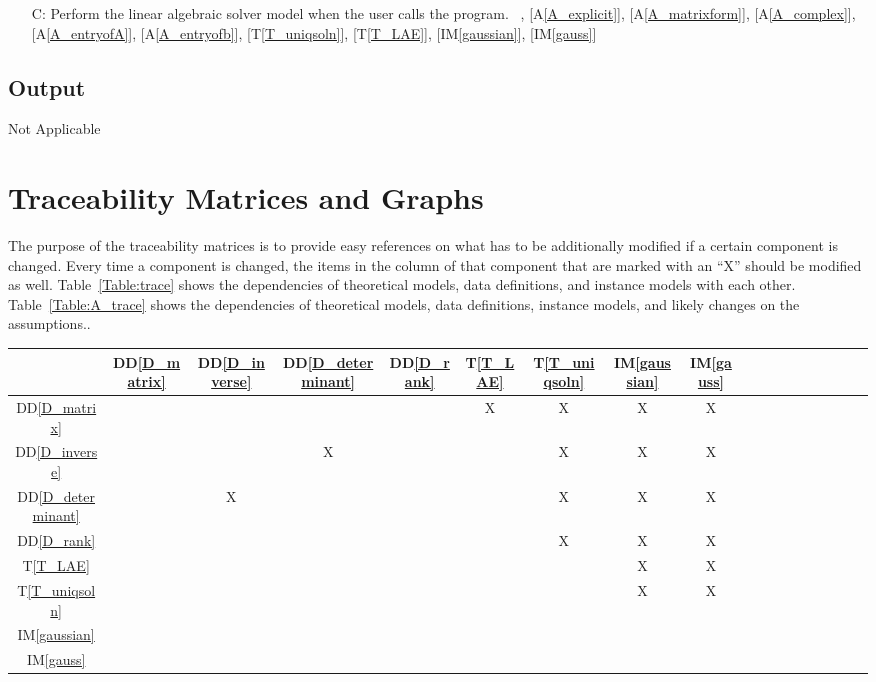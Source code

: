 \documentclass[12pt]{article}
\newcommand{\ddref}[1]{DD\ref{#1}}
\newcommand{\tref}[1]{T\ref{#1}}
\newcommand{\aref}[1]{A\ref{#1}}
\newcommand{\gsref}[1]{GS\ref{#1}}
\newcommand{\iref}[1]{IM\ref{#1}}
\newcounter{lcnum} %
\newcounter{calcnum} %
\begin{document}
{\begin{itemize}
\item[C\refstepcounter{calcnum}\thecalcnum \label{C_progname}:]
Perform the linear algebraic solver model when the user calls the program.
~\newline
[\gsref{G_solveforx}], [\aref{A_explicit}], [\aref{A_matrixform}],
[\aref{A_complex}], [\aref{A_entryofA}], [\aref{A_entryofb}],
[\tref{T_uniqsoln}], [\tref{T_LAE}], [\iref{gaussian}], [\iref{gauss}]

\end{itemize}

  

\subsection{Output} \label{sec_Output}

Not Applicable


\section{Traceability Matrices and Graphs}

The purpose of the traceability matrices is to provide easy references on what
has to be additionally modified if a certain component is changed. Every time a
component is changed, the items in the column of that component that are marked
with an ``X'' should be modified as well. Table~\ref{Table:trace} shows the
dependencies of theoretical models, data definitions, and instance models with
each other. Table~\ref{Table:A_trace} shows the dependencies of theoretical
models, data definitions, instance models, and likely changes on the
assumptions..




\begin{table}[h!]
\centering
\begin{tabular}{|c|c|c|c|c|c|c|c|c|c|c|c|c|c|c|c|c|c|}
\hline
	&\ddref{D_matrix}&\ddref{D_inverse} & \ddref{D_determinant}&\ddref{D_rank}& \tref{T_LAE}& \tref{T_uniqsoln}& \iref{gaussian}& \iref{gauss} \\
\hline

\ddref{D_matrix}   & & & & &X &X &X &X \\ \hline
\ddref{D_inverse}  & & &X & & &X &X & X\\ \hline
\ddref{D_determinant}   & &X & & & &X &X&X \\ \hline
\ddref{D_rank}   & & & & & &X &X &X \\ \hline
\tref{T_LAE}  & & & & & & &X &X \\ \hline
\tref{T_uniqsoln}  & & & & & & &X & X\\ \hline
\iref{gaussian}     & & & & & & & &  \\ \hline
\iref{gauss}    & & & & & & & & \\ \hline


\end{tabular}
\end{table}}
\end{document}
